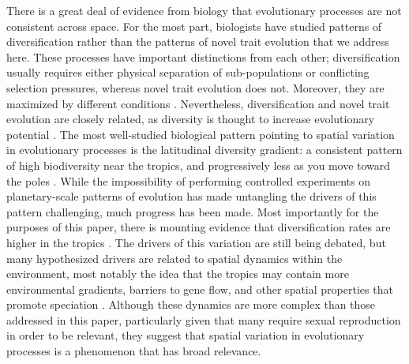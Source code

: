 \documentclass[letterpaper]{article}
\begin{document}
There is a great deal of evidence from biology that evolutionary processes are not consistent across space. For the most part, biologists have studied patterns of diversification rather than the patterns of novel trait evolution that we address here. These processes have important distinctions from each other; diversification usually requires either physical separation of sub-populations or conflicting selection pressures, whereas novel trait evolution does not. Moreover, they are maximized by different conditions \citep{walker_evolutionary_2012}. Nevertheless, diversification and novel trait evolution are closely related, as diversity is thought to increase evolutionary potential \citep{rouzic_evolutionary_2008}. The most well-studied biological pattern pointing to spatial variation in evolutionary processes is the latitudinal diversity gradient: a consistent pattern of high biodiversity near the tropics, and progressively less as you move toward the poles \citep{hillebrand_generality_2004}. While the impossibility of performing controlled experiments on planetary-scale patterns of evolution has made untangling the drivers of this pattern challenging, much progress has been made. Most importantly for the purposes of this paper, there is mounting evidence that diversification rates are higher in the tropics \citep{mittelbach_evolution_2007}. The drivers of this variation are still being debated, but many hypothesized drivers are related to spatial dynamics within the environment, most notably the idea that the tropics may contain more environmental gradients, barriers to gene flow, and other spatial properties that promote speciation \citep{moritz_diversification_2000}. Although these dynamics are more complex than those addressed in this paper, particularly given that many require sexual reproduction in order to be relevant, they suggest that spatial variation in evolutionary processes is a phenomenon that has broad relevance.
% 
%
\end{document}
